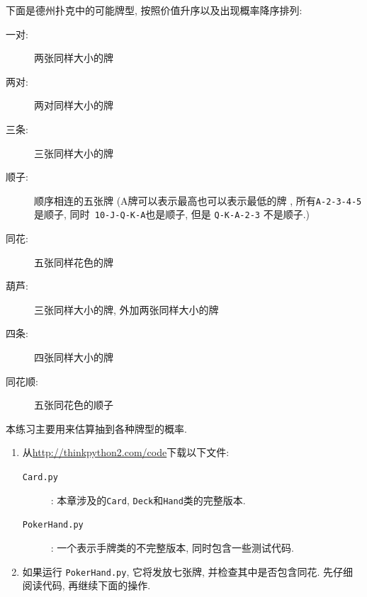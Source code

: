 \documentclass[10pt]{book}
\begin{document}
\begin{exercise}
\label{poker}
下面是德州扑克中的可能牌型, 按照价值升序以及出现概率降序排列:

\begin{description}

\item[一对:] 两张同样大小的牌
\vspace{-0.05in}

\item[两对:] 两对同样大小的牌
\vspace{-0.05in}

\item[三条:] 三张同样大小的牌
\vspace{-0.05in}

\item[顺子:] 顺序相连的五张牌 (A牌可以表示最高也可以表示最低的牌
, 所有{\tt A-2-3-4-5}是顺子, 同时{\tt
10-J-Q-K-A}也是顺子, 但是 {\tt Q-K-A-2-3} 不是顺子.)
\vspace{-0.05in}

\item[同花:] 五张同样花色的牌
\vspace{-0.05in}

\item[葫芦:] 三张同样大小的牌, 外加两张同样大小的牌
\vspace{-0.05in}

\item[四条:] 四张同样大小的牌
\vspace{-0.05in}

\item[同花顺:] 五张同花色的顺子
\vspace{-0.05in}

\end{description}
%
本练习主要用来估算抽到各种牌型的概率.

\begin{enumerate}

\item 从\url{http://thinkpython2.com/code}下载以下文件:

\begin{description}

\item[{\tt Card.py}]: 本章涉及的{\tt Card},
{\tt Deck}和{\tt Hand}类的完整版本. 

\item[{\tt PokerHand.py}]: 一个表示手牌类的不完整版本, 同时包含一些测试代码.

\end{description}
%
\item 如果运行 {\tt PokerHand.py}, 它将发放七张牌, 
并检查其中是否包含同花. 先仔细阅读代码, 再继续下面的操作. 


\end{enumerate}
\end{exercise}
\end{document}
